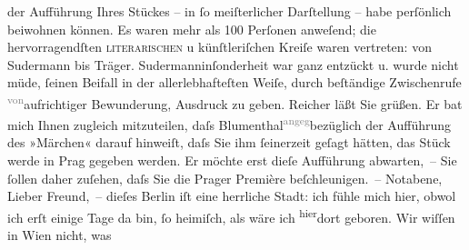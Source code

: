 \begin{ledgroupsized}[t]{13cm}
               der Aufführung Ihres Stückes – in ſo meiſterlicher Darſtellung – habe perſönlich
               beiwohnen können. Es waren mehr {\pb}als 100 Perſonen
               anweſend; die hervorragendſten \textsc{literarischen} u
               künſtleriſchen Kreiſe waren vertreten: von Sudermann bis Träger. Sudermann\introOben{}inſonderheit\introOben{} war ganz entzückt u. wurde nicht müde, ſeinen
               Beifall in der allerlebhafteſten Weiſe, durch beſtändige Zwischenrufe \substVorne{}\textsuperscript{\textcolor{gray}{von}}\substDazwischen{}aufrichtiger\substHinten{} Bewunderung, Ausdruck zu geben.\pend
           \pstart
           Reicher läßt Sie grüßen. Er bat mich Ihnen
                  \introOben{}zugleich\introOben{} mitzuteilen, daſs Blumenthal\substVorne{}\textsuperscript{\textcolor{gray}{angeg}}\substDazwischen{}bezüglich\substHinten{} der Aufführung des »Märchen« darauf {\pb}hinweiſt, daſs Sie ihm ſeinerzeit geſagt hätten, das
               Stück werde in Prag gegeben werden. Er möchte erst dieſe
               Aufführung abwarten, – Sie ſollen daher zuſehen, daſs Sie die Prager Première beſchleunigen. – Notabene, Lieber Freund, –
               dieſes Berlin iſt eine herrliche Stadt: ich fühle
               mich hier, obwol ich erſt einige Tage da bin, ſo heimiſch, als wäre {\pb}ich \substVorne{}\textsuperscript{hier}\substDazwischen{}dort\substHinten{} geboren. Wir wiſſen in Wien nicht, was

\end{ledgroupsized}
